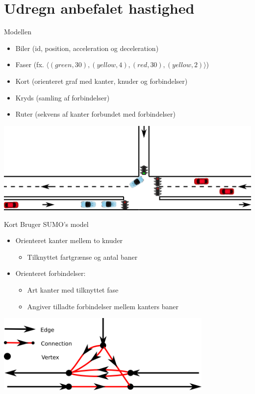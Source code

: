 \section{Udregn anbefalet hastighed}
\begin{frame}{Modellen}
\begin{itemize}
\item Biler (id, position, acceleration og deceleration)
\item Faser (fx. $\langle(green, 30), (yellow, 4), (red, 30), (yellow, 2)\rangle$)
\item Kort (orienteret graf med kanter, knuder og forbindelser)
\item Kryds (samling af forbindelser)
\item Ruter (sekvens af kanter forbundet med forbindelser)
\end{itemize}

\includegraphics[width=1\textwidth]{../images/introNetworkSimple.png}
\end{frame}

\begin{frame}{Kort}
Bruger SUMO's model
\begin{itemize}
\item Orienteret kanter mellem to knuder
	\begin{itemize}
	\item Tilknyttet fartgrænse og antal baner
\end{itemize}
\item Orienteret forbindelser: 
	\begin{itemize}
	\item Art kanter med tilknyttet fase
	\item Angiver tilladte forbindelser mellem kanters baner
	\end{itemize}
\end{itemize}

\vspace{5mm}
\begin{center}
\includegraphics[width=0.8\textwidth]{../images/ConnectionNetwork.png}
\end{center}
\end{frame}

